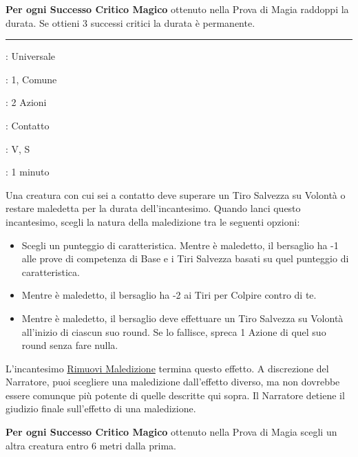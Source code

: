 \begin{multicols}{2}
\textbf{Per ogni Successo Critico Magico} ottenuto nella Prova di Magia raddoppi la durata. Se ottieni 3 successi critici la durata è permanente.

\smallskip\noindent\rule{\linewidth}{2pt} \hypertarget{Scagliare Maledizione Minore}{}\medskip{}
\noindent
\begin{description}[noitemsep, topsep=0pt, parsep=0pt, partopsep=0pt, leftmargin=0cm, labelwidth=2.8cm]
	\item[\textbf{Lista di Magia}]: Universale
	\item[\textbf{Livello}]: 1, Comune
	\item[\textbf{T. di Lancio}]: 2 Azioni
	\item[\textbf{Gittata}]: Contatto
	\item[\textbf{Componenti}]: V, S
	\item[\textbf{Durata}]: 1 minuto
\end{description}

Una creatura con cui sei a contatto deve superare un Tiro Salvezza su Volontà o restare maledetta per la durata dell'incantesimo. Quando lanci questo incantesimo, scegli la natura della maledizione tra le seguenti opzioni:

\begin{itemize}[leftmargin=*] \setlength{\itemsep}{0pt}
	\item Scegli un punteggio di caratteristica. Mentre è maledetto, il bersaglio ha -1 alle prove di competenza di Base e i Tiri Salvezza basati su quel punteggio di caratteristica.
	\item Mentre è maledetto, il bersaglio ha -2 ai Tiri per Colpire contro di te.
	\item Mentre è maledetto, il bersaglio deve effettuare un Tiro Salvezza su Volontà all'inizio di ciascun suo round. Se lo fallisce, spreca 1 Azione di quel suo round senza fare nulla.
\end{itemize}

L'incantesimo \hyperlink{Rimuovi Maledizione}{Rimuovi Maledizione} termina questo effetto. A discrezione del Narratore, puoi scegliere una maledizione dall'effetto diverso, ma non dovrebbe essere comunque più potente di quelle descritte qui sopra. Il Narratore detiene il giudizio finale sull'effetto di una maledizione.

\textbf{Per ogni Successo Critico Magico} ottenuto nella Prova di Magia scegli un altra creatura entro 6 metri dalla prima.


\end{multicols}
